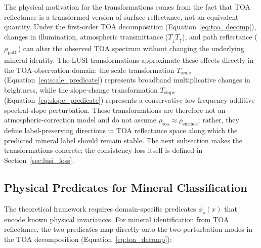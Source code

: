 \documentclass[11pt]{report}
\begin{document}
The physical motivation for the transformations comes from the fact that TOA reflectance is a transformed version of surface reflectance, not an equivalent quantity. Under the first-order TOA decomposition (Equation~\ref{eq:toa_decomp}), changes in illumination, atmospheric transmittance ($T_{\downarrow} T_{\uparrow}$), and path reflectance ($\rho_{\text{path}}$) can alter the observed TOA spectrum without changing the underlying mineral identity. The LUSI transformations approximate these effects directly in the TOA-observation domain: the scale transformation $T_{\text{scale}}$ (Equation~\ref{eq:scale_predicate}) represents broadband multiplicative changes in brightness, while the slope-change transformation $T_{\text{slope}}$ (Equation~\ref{eq:slope_predicate}) represents a conservative low-frequency additive spectral-slope perturbation. These transformations are therefore not an atmospheric-correction model and do not assume $\rho_{\text{toa}} \approx \rho_{\text{surface}}$; rather, they define label-preserving directions in TOA reflectance space along which the predicted mineral label should remain stable. The next subsection makes the transformations concrete; the consistency loss itself is defined in Section~\ref{sec:lusi_loss}.

\subsection{Physical Predicates for Mineral Classification}
\label{sec:lusi_predicates}

The theoretical framework requires domain-specific predicates $\phi_s(x)$ that encode known physical invariances. For mineral identification from TOA reflectance, the two predicates map directly onto the two perturbation modes in the TOA decomposition (Equation~\ref{eq:toa_decomp}):
\end{document}
